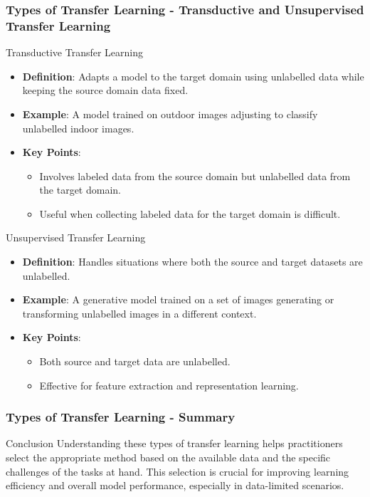 \documentclass[aspectratio=169]{beamer}
\begin{document}
\begin{frame}[fragile]
    \frametitle{Types of Transfer Learning - Transductive and Unsupervised Transfer Learning}
    \begin{block}{Transductive Transfer Learning}
        \begin{itemize}
            \item \textbf{Definition}: Adapts a model to the target domain using unlabelled data while keeping the source domain data fixed.
            \item \textbf{Example}: A model trained on outdoor images adjusting to classify unlabelled indoor images.
            \item \textbf{Key Points}:
                \begin{itemize}
                    \item Involves labeled data from the source domain but unlabelled data from the target domain.
                    \item Useful when collecting labeled data for the target domain is difficult.
                \end{itemize}
        \end{itemize}
    \end{block}

    \begin{block}{Unsupervised Transfer Learning}
        \begin{itemize}
            \item \textbf{Definition}: Handles situations where both the source and target datasets are unlabelled. 
            \item \textbf{Example}: A generative model trained on a set of images generating or transforming unlabelled images in a different context.
            \item \textbf{Key Points}:
                \begin{itemize}
                    \item Both source and target data are unlabelled.
                    \item Effective for feature extraction and representation learning.
                \end{itemize}
        \end{itemize}
    \end{block}
\end{frame}

\begin{frame}[fragile]
    \frametitle{Types of Transfer Learning - Summary}
    \begin{block}{Conclusion}
        Understanding these types of transfer learning helps practitioners select the appropriate method based on the available data and the specific challenges of the tasks at hand. This selection is crucial for improving learning efficiency and overall model performance, especially in data-limited scenarios.
    \end{block}
\end{frame}
\end{document}
